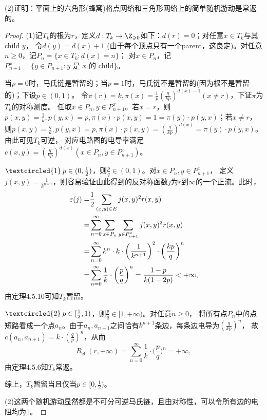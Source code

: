 \begin{enumerate}
    (2)证明：平面上的六角形(蜂窝)格点网络和三角形网络上的简单随机游动是常返的。
    \begin{proof}
        (1)记$T_k$的根为$r$，定义$d:T_k\to\Z_{\geqslant0}$如下：$d(r)=0$；对任意$x\in T_k$与其child $y$，
        令$d(y)=d(x)+1$ (由于每个顶点只有一个parent，这良定)。对任意$n\geqslant0$，记$P_n=\{x\in T_k:d(x)=n\}$；
        对$x\in P_n$，记$P_{n+1}^x=\{y\in P_{n+1}:y\text{ 是 }x\text{ 的 child}\}$。

        当$p=0$时，马氏链是暂留的；当$p=1$时，马氏链不是暂留的(因为根不是暂留的)；下设$p\in(0,1)$。
        令$\pi(r)=k,\pi(x)=\frac{1}{p}(\frac{q}{kp})^{d(x)-1}(x\neq r)$，下证$\pi$为$T_k$的对称测度。
        任取$x\in P_n,y\in P_{n+1}^x$。若$x=r$，则$p(x,y)=\frac{1}{k},p(y,x)=p,
        \pi(x)\cdot p(x,y)=1=\pi(y)\cdot p(y,x)$；若$x\neq r$，则$p(x,y)=\frac{q}{k},p(y,x)=p,
        \pi(x)\cdot p(x,y)=(\frac{q}{kp})^{d(x)}=\pi(y)\cdot p(y,x)$。由此可见$T_k$可逆，
        对应电路图的电导率满足$c(x,y)=(\frac{q}{kp})^{d(x)}(x\in P_n,y\in P_{n+1}^x)$。

        $\textcircled{1}\:p\in(0,\frac{1}{2})$，则$\frac{p}{q}\in(0,1)$。对$x\in P_n,y\in P_{n+1}^x$，
        定义$j(x,y)=\frac{1}{k^{n+1}}$，则容易验证由此得到的反对称函数$j$为$r$到$\infty$的一个正流。此时，
        \begin{align*}
            \varepsilon(j)=&\frac{1}{2}\sum_{(x,y)\in E}j(x,y)^2r(x,y)\\
            =&\sum_{n=0}^\infty\sum_{x\in P_n}\sum_{y\in P_{n+1}^x}j(x,y)^2r(x,y)\\
            =&\sum_{n=0}^\infty k^n\cdot k\cdot\bigg(\frac{1}{k^{n+1}}\bigg)^2\cdot\bigg(\frac{kp}{q}\bigg)^n\\
            =&\sum_{n=0}^\infty\frac{1}{k}\cdot\bigg(\frac{p}{q}\bigg)^n=\frac{1-p}{k(1-2p)}<+\infty,
        \end{align*}
        由定理4.5.10可知$T_k$暂留。

        $\textcircled{2}\:p\in[\frac{1}{2},1)$，则$\frac{p}{q}\in[1,+\infty)$。对任意$n\geqslant0$，
        将所有点$P_n$中的点短路看成一个点$a_n$。由于$a_n,a_{n+1}$之间恰有$k^{n+1}$条边，每条边电导为$(\frac{q}{kp})^n$，
        故$c(a_n,a_{n+1})=k\cdot(\frac{q}{p})^n$，从而\[R_{\text{eff}}(r,+\infty)=
        \sum_{n=0}^\infty\frac{1}{k}\cdot\bigg(\frac{p}{q}\bigg)^n=+\infty,\]由定理4.5.6知$T_k$常返。

        综上，$T_k$暂留当且仅当$p\in[0,\frac{1}{2})$。

        (2)这两个随机游动显然都是不可分可逆马氏链，且由对称性，可以令所有边的电阻均为$1$。


\end{proof}
\end{enumerate}
